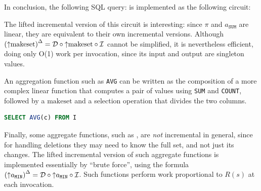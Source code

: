 In conclusion, the following SQL query: 
is implemented as the following circuit:


The lifted incremental version of this circuit is interesting: since $\pi$ 
and $a_\texttt{SUM}$ are linear, they are equivalent to their own incremental 
versions.  Although ${({\uparrow}\mbox{makeset})}^{\Delta} = \mathcal{D} \circ {\uparrow}\mbox{makeset} \circ \mathcal{I}$
cannot be simplified, it is nevertheless efficient, doing only O(1) work per
invocation, since its input and output are singleton values.

An aggregation function such as \texttt{AVG} can be written as the composition of 
a more complex linear function that computes a pair of values using 
\texttt{SUM} and \texttt{COUNT}, followed by a $\mbox{makeset}$ and a selection operation
that divides the two columns.

\begin{lstlisting}[language=SQL]
SELECT AVG(c) FROM I 
\end{lstlisting}


Finally, some aggregate functions, such as , are 
\emph{not} incremental in general, since for handling deletions
they may need to know the full set, and not just its changes.  The lifted
incremental version of such aggregate functions is implemented essentially
by ``brute force'', using the formula ${({\uparrow}a_\texttt{MIN})}^{\Delta}
= \mathcal{D} \circ {\uparrow}a_\texttt{MIN} \circ \mathcal{I}$.  Such functions perform work
proportional to $R(s)$ at each invocation.


